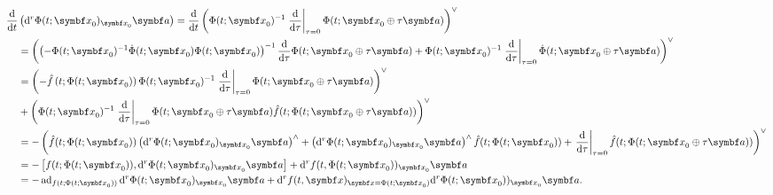 \begin{equation*}
  \begin{aligned}
    \frac{\mathrm{d}}{\mathrm{d}t}
     & \left( \mathrm{d}^r \Phi(t; \x_0)_{\x_0} \a \right)
    = \frac{\mathrm{d}}{\mathrm{d}t} \left( \Phi(t; \x_{0})^{-1} \left. \frac{\mathrm{d}}{\mathrm{d} \tau} \right|_{\tau = 0} \Phi(t; \x_{0} \oplus \tau \a) \right)^{\vee}                                                                                                                          \\
     & = \left( \left( -\Phi(t; \x_{0})^{-1} \dot \Phi(t; \x_{0}) \Phi(t; \x_{0}) \right)^{-1} \frac{\mathrm{d}}{\mathrm{d}\tau} \Phi(t; \x_{0} \oplus \tau \a) +  \Phi(t; \x_{0})^{-1} \left. \frac{\mathrm{d}}{\mathrm{d}\tau} \right|_{\tau=0} \dot \Phi(t; \x_{0} \oplus \tau \a) \right)^{\vee} \\
     & = \left( -\hat f\left(t; \Phi(t; \x_{0})\right) \Phi(t; \x_{0})^{-1} \left. \frac{\mathrm{d}}{\mathrm{d}\tau} \right|_{\tau = 0} \Phi(t; \x_{0} \oplus \tau \a) \right)^\vee                                                                                                                  \\
     & + \left( \Phi(t; \x_{0})^{-1} \left. \frac{\mathrm{d}}{\mathrm{d}\tau} \right|_{\tau = 0} \Phi(t; \x_{0} \oplus \tau \a) \hat f(t; \Phi(t; \x_{0} \oplus \tau \a)) \right)^{\vee}                                                                                                             \\
     & = - \left( \hat f(t; \Phi(t; \x_{0})) \left( \mathrm{d}^{r} \Phi(t; \x_{0})_{\x_{0}} \a \right)^{\wedge}
    + \left( \mathrm{d}^{r} \Phi(t; \x_{0})_{\x_{0}} \a \right)^{\wedge} \hat f(t; \Phi(t; \x_{0}))  + \left. \frac{\mathrm{d}}{\mathrm{d}\tau} \right|_{\tau = 0} \hat f(t; \Phi(t; \x_{0} \oplus \tau \a)) \right)^{\vee}                                                                          \\
     & = -\left[  f(t; \Phi(t; \x_{0})), \mathrm{d}^{r} \Phi(t; \x_{0})_{\x_{0}} \a\right] + \mathrm{d}^{r} f(t, \Phi(t; \x_{0}))_{\x_{0}} \a                                                                                                                                                        \\
     & = -\ad_{f(t; \Phi(t; \x_{0}))} \mathrm{d}^{r} \Phi(t; \x_{0})_{\x_{0}} \a + \mathrm{d}^{r} f(t, \x)_{\x = \Phi(t; \x_{0})} \mathrm{d}^{r} \Phi(t; \x_{0}))_{\x_{0}} \a.
  \end{aligned}
\end{equation*}
